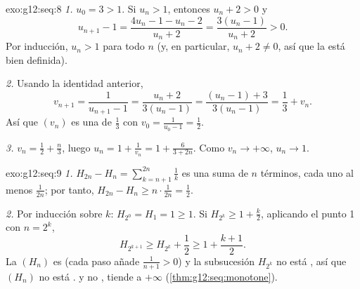 \begin{solution}{exo:g12:seq:8}
\emph{1.} $u_0 = 3 > 1$. Si $u_n > 1$, entonces $u_n + 2 > 0$ y
\[
u_{n+1} - 1 = \frac{4u_n - 1 - u_n - 2}{u_n + 2} = \frac{3(u_n - 1)}{u_n + 2} > 0 .
\]
Por inducción, $u_n > 1$ para todo $n$ (y, en particular,
$u_n + 2 \neq 0$, así que la  está bien definida).

\emph{2.} Usando la identidad anterior,
\[
v_{n+1} = \frac{1}{u_{n+1} - 1} = \frac{u_n + 2}{3(u_n - 1)}
= \frac{(u_n - 1) + 3}{3(u_n - 1)} = \frac{1}{3} + v_n .
\]
Así que $(v_n)$ es una  de  $\frac13$ con
$v_0 = \frac{1}{u_0 - 1} = \frac12$.

\emph{3.} $v_n = \frac12 + \frac{n}{3}$, luego
$u_n = 1 + \frac{1}{v_n} = 1 + \frac{6}{3 + 2n}$. Como $v_n \to +\infty$,
$u_n \to 1$.
\end{solution}

\begin{solution}{exo:g12:seq:9}
\emph{1.} $H_{2n} - H_n = \sum_{k=n+1}^{2n} \frac{1}{k}$ es una suma de
$n$ términos, cada uno al menos $\frac{1}{2n}$; por tanto,
$H_{2n} - H_n \geq n \cdot \frac{1}{2n} = \frac12$.

\emph{2.} Por inducción sobre $k$: $H_{2^0} = H_1 = 1 \geq 1$. Si
$H_{2^k} \geq 1 + \frac{k}{2}$, aplicando el punto 1 con $n = 2^k$,
\[
H_{2^{k+1}} \geq H_{2^k} + \frac12 \geq 1 + \frac{k+1}{2}.
\]
La  $(H_n)$ es  (cada paso añade $\frac{1}{n+1} > 0$) y
la subsucesión $H_{2^k}$ no está , así que $(H_n)$ no está .  y no , tiende a $+\infty$
(\cref{thm:g12:seq:monotone}).
\end{solution}


